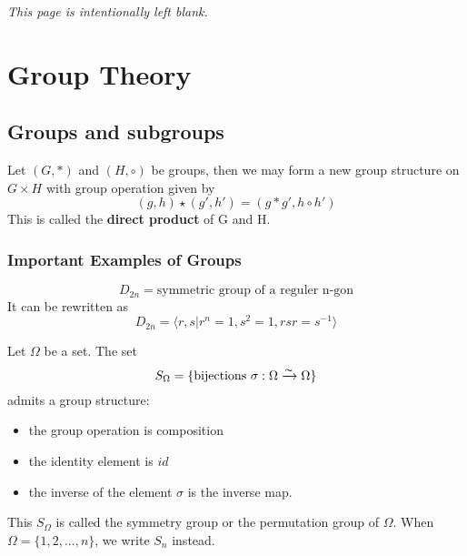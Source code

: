 \documentclass[11pt,fleqn]{book} %
\begin{document}
\begin{CJK}{UTF8}{gkai}
\pagestyle{fancy} %

\newpage
\thispagestyle{empty}
\centering 
\vspace*{10cm}
\textit{This page is intentionally left blank.}

\chapter{Group Theory}
\section{Groups and subgroups}
\begin{definition}
	 Let $(G, *)$ and $(H, \circ )$ be groups, then we may form a new group structure
	on $G \times H$ with group operation given by 
	\[(g, h) \star (g', h') = (g*g', h\circ h') \]
	This is called the {\bf direct product} of G and H.
\end{definition}

\subsection{Important Examples of Groups} 
\begin{definition}
	 \[D_{2n} = \text{symmetric group of a reguler n-gon}\]
	It can be rewritten as 
	\[D_{2n} = \langle r,s | r^n = 1, s^2 = 1, rsr = s^{-1}\rangle \]
\end{definition}

\begin{definition}
	 Let $\Omega$ be a set. The set 
	\[S_\Omega = \{\text{bijections } \sigma: \Omega \xrightarrow{\thicksim} \Omega\}\]
	admits a group structure:
	\begin{itemize}
		\item the group operation is composition
		\item the identity element is $id$
		\item the inverse of the element $\sigma$ is the inverse map.
	\end{itemize}
	This $S_\Omega$ is called the symmetry group or the permutation group of $\Omega$.
	When $\Omega = \{1,2 ,...,n\}$, we write $S_n$ instead.
\end{definition}


\end{CJK}
\end{document}
